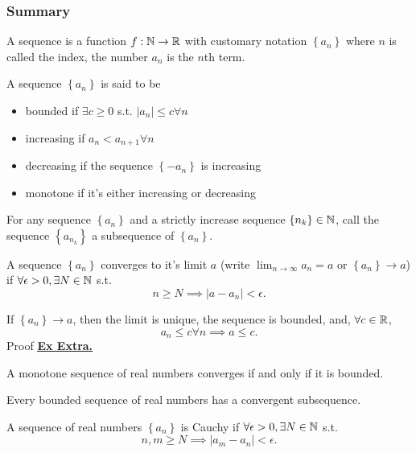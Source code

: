 \newcommand{\seq}[1]{\left\{#1\right\}}
\newcommand{\abs}[1]{\left|#1\right|}

\subsubsection{Summary}

\noindent A sequence is a function $f:\mathbb{N} \to \mathbb{R}$ with customary notation $\seq{a_n}$ 
where $n$ is called the index, the number $a_n$ is the $n$th term.

\noindent A sequence $\seq{a_n}$ is said to be
\begin{itemize}
    \item bounded if $\exists c \geq 0$ s.t. $\abs{a_n} \leq c \forall n$ 
    \item increasing if $a_n < a_{n+1} \forall n$
    \item decreasing if the sequence $\seq{-a_n}$ is increasing
    \item monotone if it's either increasing or decreasing
\end{itemize}

\noindent For any sequence $\seq{a_n}$ and a strictly increase sequence $\seq{n_k} \in \N$,
call the sequence $\seq{a_{n_k}}$ a subsequence of $\seq{a_n}$.

\begin{defn}
    A sequence $\seq{a_n}$ converges to it's limit $a$ (write $\lim_{n \to \infty} a_n = a$ or $\seq{a_n}\to a$) if $\forall \epsilon > 0, \exists N \in \mathbb{N}$ s.t.
    \[ n\geq N \implies \abs{a - a_n} < \epsilon.\]
\end{defn}

\begin{prop}
    If $\seq{a_n}\to a$, then the limit is unique, the sequence is bounded, and, $\forall c \in \mathbb{R}$, 
    \[ a_n \leq c \forall n \implies a \leq c.\]
    Proof \hyperref[ex:1.5.extra]{\underline{\textbf{Ex Extra.}}}
\end{prop}

\begin{thm}
    A monotone sequence of real numbers converges if and only if it is bounded.
\end{thm}
\begin{thm}
    Every bounded sequence of real numbers has a convergent subsequence.
\end{thm}
\begin{defn}
    A sequence of real numbers $\seq{a_n}$ is Cauchy if $\forall \epsilon > 0, \exists N\in\mathbb{N}$ s.t.
    \[ n, m \geq N \implies \abs{a_m - a_n} < \epsilon.\]
\end{defn}

